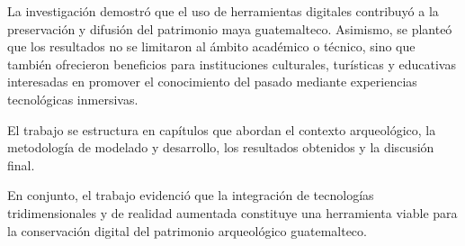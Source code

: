 La investigación demostró que el uso de herramientas digitales contribuyó a la preservación y difusión del patrimonio maya guatemalteco. Asimismo, se planteó que los resultados no se limitaron al ámbito académico o técnico, sino que también ofrecieron beneficios para instituciones culturales, turísticas y educativas interesadas en promover el conocimiento del pasado mediante experiencias tecnológicas inmersivas.

El trabajo se estructura en capítulos que abordan el contexto arqueológico, la metodología de modelado y desarrollo, los resultados obtenidos y la discusión final.

En conjunto, el trabajo evidenció que la integración de tecnologías tridimensionales y de realidad aumentada constituye una herramienta viable para la conservación digital del patrimonio arqueológico guatemalteco.